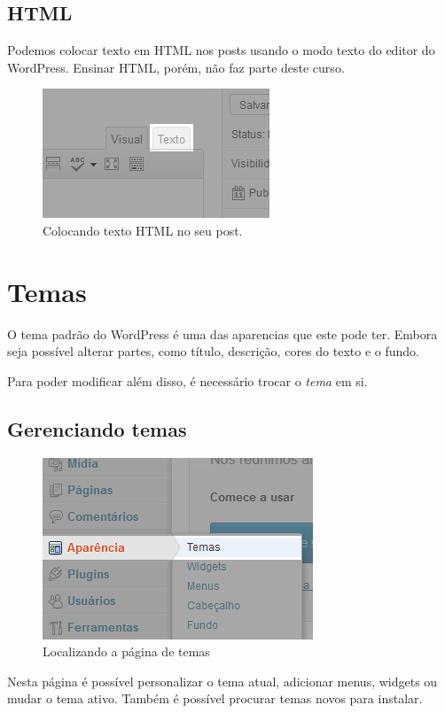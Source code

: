 \documentclass[12pt,onecolumn]{article}
\begin{document}
	\subsection{HTML}
		Podemos colocar texto em HTML nos posts usando o modo texto do editor
		do WordPress. Ensinar HTML, porém, não faz parte deste curso.
		\begin{figure}[H]
			\centering
			\includegraphics{html1.png}
			\caption{Colocando texto HTML no seu post.}
		\end{figure}

\section{Temas}
	O tema padrão do WordPress é uma das aparencias que este pode ter. Embora seja 
	possível alterar partes, como título, descrição, cores do texto e o fundo.
	
	Para poder modificar além disso, é necessário trocar o \textit{tema} em si.
	
	\subsection{Gerenciando temas}
		\begin{figure}[H]
			\centering
			\includegraphics{tema1.png}
			\caption{Localizando a página de temas}
		\end{figure}
		Nesta página é possível personalizar o tema atual, adicionar menus, widgets
		ou mudar o tema ativo. Também é possível procurar temas novos para instalar.
		
\end{document}
